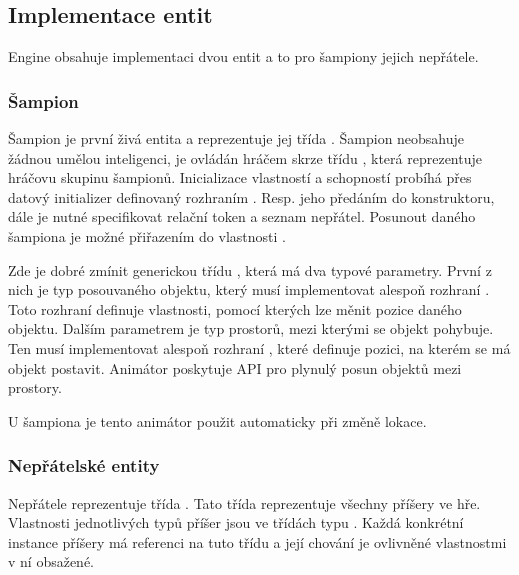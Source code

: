 \subsection{Implementace entit}
Engine obsahuje implementaci dvou entit a to pro šampiony jejich nepřátele.

\subsubsection{Šampion}
Šampion je první živá
entita a reprezentuje jej třída . Šampion neobsahuje žádnou umělou inteligenci, je ovládán hráčem skrze
třídu , která reprezentuje hráčovu skupinu šampionů. Inicializace vlastností a schopností probíhá přes
datový initializer definovaný rozhraním . Resp. jeho předáním do konstruktoru, dále je nutné
specifikovat relační token a seznam nepřátel. Posunout daného šampiona je možné přiřazením do vlastnosti .

Zde je dobré zmínit generickou třídu , která má dva typové parametry. První z nich je typ posouvaného 
objektu, který musí implementovat alespoň rozhraní . Toto  rozhraní definuje vlastnosti, pomocí kterých lze měnit
pozice daného objektu. Dalším parametrem je typ prostorů, mezi kterými se objekt pohybuje. Ten musí implementovat alespoň 
rozhraní , které definuje pozici, na kterém se má objekt postavit. Animátor poskytuje API pro plynulý
posun objektů mezi prostory.

U šampiona je tento animátor použit automaticky při změně lokace.

\subsubsection{Nepřátelské entity}
Nepřátele reprezentuje třída . Tato třída reprezentuje všechny 
příšery ve hře. Vlastnosti jednotlivých typů příšer jsou ve třídách typu . Každá konkrétní instance 
příšery má referenci na tuto třídu a její chování je ovlivněné vlastnostmi v ní obsažené. 

